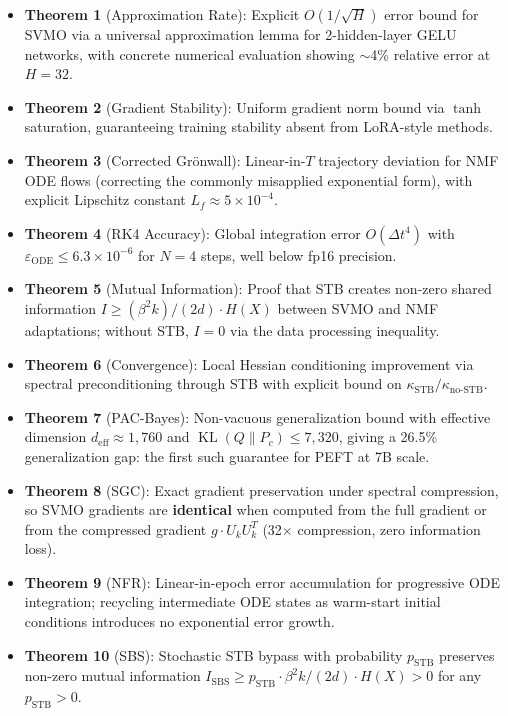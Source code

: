 \documentclass[conference]{IEEEtran}
\newcommand{\svmo}{\textsc{SVMO}}
\newcommand{\nmf}{\textsc{NMF}}
\newcommand{\stb}{\textsc{STB}}
\newcommand{\KL}{\operatorname{KL}}
\begin{document}
\begin{itemize}[leftmargin=*]
    \item \textbf{Theorem 1} (Approximation Rate): Explicit $O(1/\sqrt{H})$ error bound for \svmo{} via a universal approximation lemma for 2-hidden-layer GELU networks, with concrete numerical evaluation showing $\sim$4\% relative error at $H=32$.
    \item \textbf{Theorem 2} (Gradient Stability): Uniform gradient norm bound via $\tanh$ saturation, guaranteeing training stability absent from LoRA-style methods.
    \item \textbf{Theorem 3} (Corrected Gr\"onwall): Linear-in-$T$ trajectory deviation for \nmf{} ODE flows (correcting the commonly misapplied exponential form), with explicit Lipschitz constant $L_f \approx 5\times 10^{-4}$.
    \item \textbf{Theorem 4} (RK4 Accuracy): Global integration error $O(\Delta t^4)$ with $\varepsilon_{\text{ODE}} \leq 6.3\times 10^{-6}$ for $N=4$ steps, well below fp16 precision.
    \item \textbf{Theorem 5} (Mutual Information): Proof that \stb{} creates non-zero shared information $I \geq (\beta^2 k)/(2d) \cdot H(X)$ between SVMO and NMF adaptations; without \stb{}, $I=0$ via the data processing inequality.
    \item \textbf{Theorem 6} (Convergence): Local Hessian conditioning improvement via spectral preconditioning through \stb{} with explicit bound on $\kappa_{\text{STB}}/\kappa_{\text{no-STB}}$.
    \item \textbf{Theorem 7} (PAC-Bayes): Non-vacuous generalization bound with effective dimension $d_{\text{eff}} \approx 1{,}760$ and $\KL(Q\|P_c) \leq 7{,}320$, giving a 26.5\% generalization gap: the first such guarantee for PEFT at 7B scale.
    \item \textbf{Theorem 8} (SGC): Exact gradient preservation under spectral compression, so SVMO gradients are \textbf{identical} when computed from the full gradient or from the compressed gradient $g \cdot U_k U_k^T$ (32$\times$ compression, zero information loss).
    \item \textbf{Theorem 9} (NFR): Linear-in-epoch error accumulation for progressive ODE integration; recycling intermediate ODE states as warm-start initial conditions introduces no exponential error growth.
    \item \textbf{Theorem 10} (SBS): Stochastic STB bypass with probability $p_{\text{STB}}$ preserves non-zero mutual information $I_{\text{SBS}} \geq p_{\text{STB}} \cdot \beta^2 k/(2d) \cdot H(X) > 0$ for any $p_{\text{STB}} > 0$.
\end{itemize}
\end{document}
